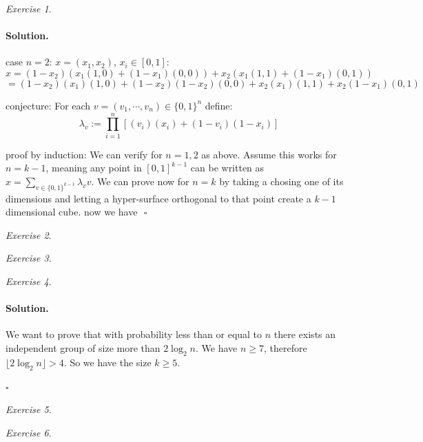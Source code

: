 \documentclass[11pt]{article}
\theoremstyle{definition}
\theoremstyle{remark}
\newtheorem{exercise}{Exercise}[section]
\newenvironment{solution}{\paragraph{Solution.}}{\hfill$\square$\medskip}
\newcommand{\1}{\mathbf{1}}
\begin{document}
\begin{exercise}
	
\end{exercise}
\begin{solution}

case \(n=2\): \(x=(x_1, x_2)\), \(x_i \in [0,1]\):
\[
x = (1-x_2)(x_1(1,0)+ (1-x_1)(0,0)) + x_2 (x_1(1,1) + (1-x_1)(0,1))
\]
\[
= (1-x_2)(x_1)(1,0) + (1-x_2)(1-x_2)(0,0) + x_2(x_1)(1,1) + x_2(1-x_1)(0,1)
\]

conjecture: For each $v = (v_1,\cdots,v_n) \in \{0,1\}^n$ define:
\[
\lambda_v := \prod_{i=1}^{n}[(v_i)(x_i)+(1-v_i)(1-x_i)]
\]

proof by induction: We can verify for \(n=1,2\) as above. Assume this works for \(n=k-1\), meaning any point in \([0,1]^{k-1}\) can be written as \(x= \sum_{v\in \{0,1\}^{k-1}} \lambda_v v\). We can prove now for \(n=k\) by taking a chosing one of its dimensions and letting a hyper-surface orthogonal to that point create a \(k-1\) dimensional cube. now we have \(\) 
\end{solution}

\begin{exercise}
	
\end{exercise}

\begin{exercise}
	
\end{exercise}

\begin{exercise}
	
\end{exercise}

\begin{solution}
	
	We want to prove that with probability less than or equal to \(n\) there exists an independent group of size more than \(2 \log_2 n\). We have \(n \geq 7\), therefore \(\lfloor 2 \log_2 n \rfloor > 4\). So we have the size \(k \geq 5\).
	
	
	
	
\end{solution}

\begin{exercise}
	
\end{exercise}

\begin{exercise}
	
\end{exercise}
\end{document}

